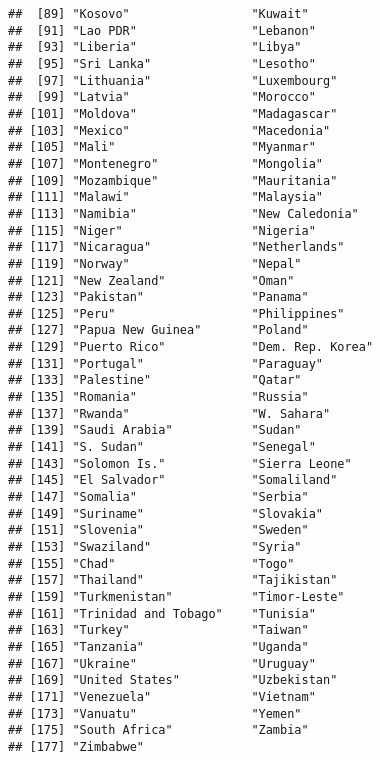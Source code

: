 \documentclass[]{article}
\begin{document}
\begin{verbatim}
##  [89] "Kosovo"                 "Kuwait"                
##  [91] "Lao PDR"                "Lebanon"               
##  [93] "Liberia"                "Libya"                 
##  [95] "Sri Lanka"              "Lesotho"               
##  [97] "Lithuania"              "Luxembourg"            
##  [99] "Latvia"                 "Morocco"               
## [101] "Moldova"                "Madagascar"            
## [103] "Mexico"                 "Macedonia"             
## [105] "Mali"                   "Myanmar"               
## [107] "Montenegro"             "Mongolia"              
## [109] "Mozambique"             "Mauritania"            
## [111] "Malawi"                 "Malaysia"              
## [113] "Namibia"                "New Caledonia"         
## [115] "Niger"                  "Nigeria"               
## [117] "Nicaragua"              "Netherlands"           
## [119] "Norway"                 "Nepal"                 
## [121] "New Zealand"            "Oman"                  
## [123] "Pakistan"               "Panama"                
## [125] "Peru"                   "Philippines"           
## [127] "Papua New Guinea"       "Poland"                
## [129] "Puerto Rico"            "Dem. Rep. Korea"       
## [131] "Portugal"               "Paraguay"              
## [133] "Palestine"              "Qatar"                 
## [135] "Romania"                "Russia"                
## [137] "Rwanda"                 "W. Sahara"             
## [139] "Saudi Arabia"           "Sudan"                 
## [141] "S. Sudan"               "Senegal"               
## [143] "Solomon Is."            "Sierra Leone"          
## [145] "El Salvador"            "Somaliland"            
## [147] "Somalia"                "Serbia"                
## [149] "Suriname"               "Slovakia"              
## [151] "Slovenia"               "Sweden"                
## [153] "Swaziland"              "Syria"                 
## [155] "Chad"                   "Togo"                  
## [157] "Thailand"               "Tajikistan"            
## [159] "Turkmenistan"           "Timor-Leste"           
## [161] "Trinidad and Tobago"    "Tunisia"               
## [163] "Turkey"                 "Taiwan"                
## [165] "Tanzania"               "Uganda"                
## [167] "Ukraine"                "Uruguay"               
## [169] "United States"          "Uzbekistan"            
## [171] "Venezuela"              "Vietnam"               
## [173] "Vanuatu"                "Yemen"                 
## [175] "South Africa"           "Zambia"                
## [177] "Zimbabwe"
\end{verbatim}
\end{document}
